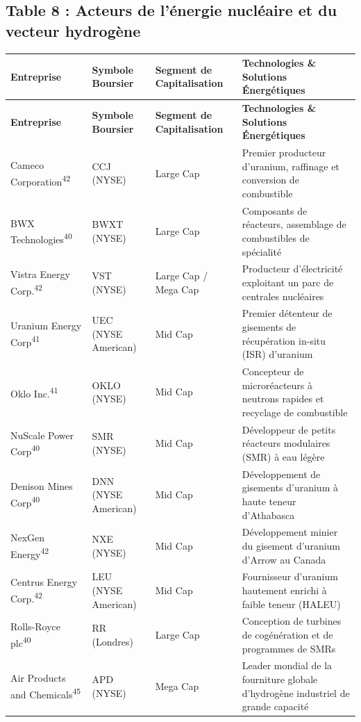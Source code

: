 \documentclass[11pt,a4paper]{article}
\begin{document}
\subsection*{Table 8 : Acteurs de l'énergie nucléaire et du vecteur hydrogène}
\begin{longtable}{p{3cm} p{3.5cm} p{3cm} p{5cm}}
\toprule
\textbf{Entreprise} & \textbf{Symbole Boursier} & \textbf{Segment de Capitalisation} & \textbf{Technologies \& Solutions Énergétiques} \\
\midrule
\endfirsthead
\toprule
\textbf{Entreprise} & \textbf{Symbole Boursier} & \textbf{Segment de Capitalisation} & \textbf{Technologies \& Solutions Énergétiques} \\
\midrule
\endhead
Cameco Corporation\textsuperscript{42} & CCJ (NYSE) & Large Cap & Premier producteur d'uranium, raffinage et conversion de combustible \\
BWX Technologies\textsuperscript{40} & BWXT (NYSE) & Large Cap & Composants de réacteurs, assemblage de combustibles de spécialité \\
Vistra Energy Corp.\textsuperscript{42} & VST (NYSE) & Large Cap / Mega Cap & Producteur d'électricité exploitant un parc de centrales nucléaires \\
Uranium Energy Corp\textsuperscript{41} & UEC (NYSE American) & Mid Cap & Premier détenteur de gisements de récupération in-situ (ISR) d'uranium \\
Oklo Inc.\textsuperscript{41} & OKLO (NYSE) & Mid Cap & Concepteur de microréacteurs à neutrons rapides et recyclage de combustible \\
NuScale Power Corp\textsuperscript{40} & SMR (NYSE) & Mid Cap & Développeur de petits réacteurs modulaires (SMR) à eau légère \\
Denison Mines Corp\textsuperscript{40} & DNN (NYSE American) & Mid Cap & Développement de gisements d'uranium à haute teneur d'Athabasca \\
NexGen Energy\textsuperscript{42} & NXE (NYSE) & Mid Cap & Développement minier du gisement d'uranium d'Arrow au Canada \\
Centrus Energy Corp.\textsuperscript{42} & LEU (NYSE American) & Mid Cap & Fournisseur d'uranium hautement enrichi à faible teneur (HALEU) \\
Rolls-Royce plc\textsuperscript{40} & RR (Londres) & Large Cap & Conception de turbines de cogénération et de programmes de SMRs \\
Air Products and Chemicals\textsuperscript{45} & APD (NYSE) & Mega Cap & Leader mondial de la fourniture globale d'hydrogène industriel de grande capacité \\

\end{longtable}
\end{document}

